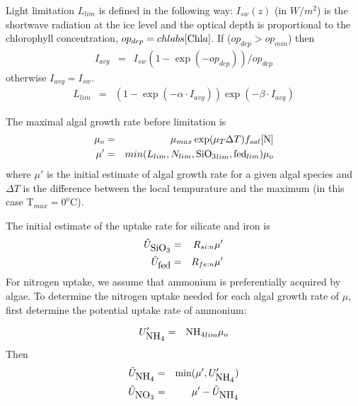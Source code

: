 Light limitation $L_{lim}$ is defined in the following way:   $I
_{sw}(z)$ (in $W/m^2$) is the shortwave radiation
at the ice level and the optical depth is proportional to the
chlorophyll concentration, $op_{dep} = chlabs [\mbox{Chl}a] $.
If ($op_{dep} > op_{min}$) then
\begin{eqnarray}
I_{avg} & = & I_{sw}(1- \exp(-op_{dep}))/op_{dep} \nonumber
\end{eqnarray}
otherwise $I_{avg} = I_{sw}$.
\begin{eqnarray}
L_{lim} & = & (1 - \exp(-\alpha\cdot I_{avg}))\exp(-\beta \cdot I_{avg})
\end{eqnarray}

The maximal algal growth rate before limitation is
\begin{eqnarray}
\mu_o & = & \mu_{max}\exp(\mu_T\Delta T)f_{sal}[\mbox{N}]  \nonumber \\
\mu' & = & min(L_{lim},N_{lim},\mbox{SiO$_3$}_{lim},\mbox{fed}_{lim}) \mu_o
\end{eqnarray}
where $\mu'$ is the initial estimate of algal growth rate for a given
algal species and $\Delta T$ is the difference between the local
tempurature and the maximum (in this case T$_{max} = 0^o$C).

The initial estimate of the uptake rate for silicate and iron  is
\begin{eqnarray}
\tilde{U}_{\mbox{SiO$_3$}} & = & R_{si:n}\mu' \nonumber \\
\tilde{U}_{\mbox{fed}} & = & R_{fe:n}\mu'
\end{eqnarray}
For nitrogen uptake, we assume that ammonium is preferentially acquired by algae.  To
determine the nitrogen uptake needed for each algal growth rate of
$\mu$, first determine the potential  uptake rate of
ammonium:

\begin{eqnarray}
U'_{\mbox{NH$_4$}} & = &\mbox{NH$_4$}_{lim}\mu_o
\end{eqnarray}
Then
\begin{eqnarray}
\tilde{U}_{\mbox{NH$_4$}} & = & \min(\mu', U'_{\mbox{NH$_4$}}) \nonumber \\
\tilde{U}_{\mbox{NO$_3$}} & = & \mu' - \tilde{U}_{\mbox{NH$_4$}}
\end{eqnarray}

